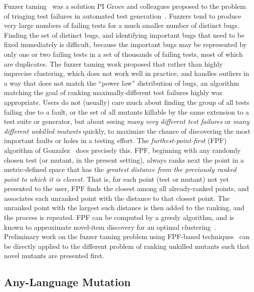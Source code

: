 Fuzzer taming~\cite{PLDI13} was a solution PI Groce and colleagues proposed to the problem
of triaging test failures in automated test generation~\cite{SemCrash}.  
Fuzzers tend to produce very large numbers of failing tests for a much
smaller number of distinct bugs.  Finding the set of distinct bugs,
and identifying important bugs that need to be fixed immediately is
difficult, because the important bugs may be represented by only one
or two failing tests in a set of thousands of failing tests, most of
which are duplicates.  The fuzzer taming work proposed that rather than highly imprecise
clustering, which does not work well in practice, and handles outliers
in a way that does not match the ``power law'' distribution of bugs, an
algorithm matching the goal of ranking maximally-different test
failures highly was appropriate.  Users do not (usually) care much
about finding the group of all tests failing due to a fault, or the
set of all mutants killable by the same extension to a test suite or
generator, but about seeing \emph{many very different test failures} or \emph{many
  different unkilled mutants} quickly, to maximize the chance of
discovering the most important faults or holes in a testing effort.
The \emph{furthest-point-first} (FPF) algorithm of
Gonzalez~\cite{Gonzalez85} does precisely this.  FPF, beginning with
any randomly chosen test (or mutant, in the present setting), always ranks
next the point in a metric-defined space that has the \emph{greatest
  distance from the previously ranked point to which it is closest.}
That is, for each point (test or mutant) not yet presented to the
user, FPF finds the closest among all already-ranked points, and
associates each unranked point with the distance to that closest
point.  The unranked point with the largest such distance is then
added to the ranking, and the process is repeated.  FPF can be
computed by a greedy algorithm, and is known to approximate novel-item
discovery for an optimal clustering~\cite{Gonzalez85}.  Preliminary work on the fuzzer taming problem using FPF-based
techniques~\cite{PLDI13,distMut} can be directly applied
to the different problem of ranking
unkilled mutants such that novel mutants are presented first.  %

\subsection{Any-Language Mutation}

